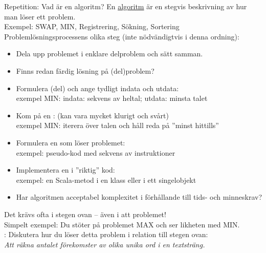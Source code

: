 


\begin{Slide}{Repetition: Vad är en algoritm? }\SlideFontTiny
\pause En \href{https://sv.wikipedia.org/wiki/Algoritm}{algoritm} är en stegvis beskrivning av hur man löser ett problem. \\ 
Exempel: SWAP, MIN, Registrering, Sökning, Sortering \\
\pause\vspace{0.5em}
Problemlösningsprocessens olika steg (inte nödvändigtvis i denna ordning): 
\begin{itemize}
\item Dela upp problemet i enklare delproblem och sätt samman.
\item Finns redan färdig lösning på (del)problem?
\item Formulera (del) och ange tydligt indata och utdata: \\ exempel MIN: indata: sekvens av heltal; utdata: minsta talet
\item Kom på en : (kan  vara mycket klurigt och svårt) \\ exempel MIN: iterera över talen och håll reda på ''minst hittills''
\item Formulera en  som löser problemet: \\ exempel: pseudo-kod med sekvens av instruktioner
\item Implementera en  i ''riktig'' kod: \\ exempel: en Scala-metod i en klass eller i ett singelobjekt
\item Har algoritmen acceptabel komplexitet i förhållande till tids- och minneskrav?
\end{itemize}
\pause Det krävs ofta  i stegen ovan  -- även i att  problemet!\\
Simpelt exempel: Du stöter på problemet MAX och ser likheten med MIN.\\
\pause\vspace{0.5em}: Diskutera hur du löser detta problem i relation till stegen ovan: \\
\emph{Att räkna antalet förekomster av olika unika ord i en textsträng.} 
\end{Slide}












